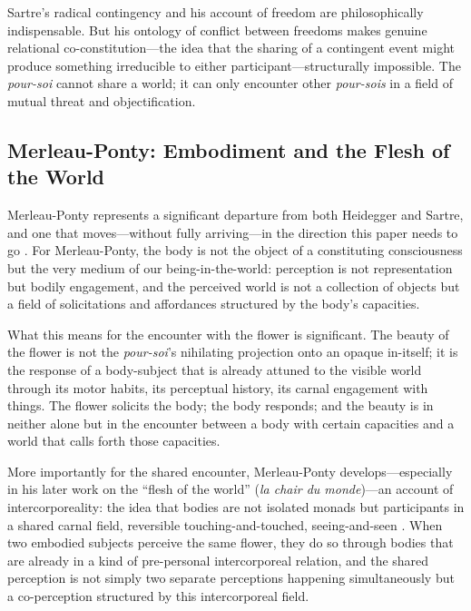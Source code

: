 \begin{claim}
Sartre's radical contingency and his account of freedom are philosophically indispensable. But his ontology of conflict between freedoms makes genuine relational co-constitution---the idea that the sharing of a contingent event might produce something irreducible to either participant---structurally impossible. The \emph{pour-soi} cannot share a world; it can only encounter other \emph{pour-sois} in a field of mutual threat and objectification.
\end{claim}

\subsection{Merleau-Ponty: Embodiment and the Flesh of the World}
\label{p14:subsec:merleau}

\noindent
Merleau-Ponty represents a significant departure from both Heidegger and Sartre, and one that moves---without fully arriving---in the direction this paper needs to go \parencite{merleau-ponty1962}. For Merleau-Ponty, the body is not the object of a constituting consciousness but the very medium of our being-in-the-world: perception is not representation but bodily engagement, and the perceived world is not a collection of objects but a field of solicitations and affordances structured by the body's capacities.

What this means for the encounter with the flower is significant. The beauty of the flower is not the \emph{pour-soi}'s nihilating projection onto an opaque in-itself; it is the response of a body-subject that is already attuned to the visible world through its motor habits, its perceptual history, its carnal engagement with things. The flower solicits the body; the body responds; and the beauty is in neither alone but in the encounter between a body with certain capacities and a world that calls forth those capacities.

More importantly for the shared encounter, Merleau-Ponty develops---especially in his later work on the ``flesh of the world'' (\emph{la chair du monde})---an account of intercorporeality: the idea that bodies are not isolated monads but participants in a shared carnal field, reversible touching-and-touched, seeing-and-seen \parencite{merleau-ponty1962}. When two embodied subjects perceive the same flower, they do so through bodies that are already in a kind of pre-personal intercorporeal relation, and the shared perception is not simply two separate perceptions happening simultaneously but a co-perception structured by this intercorporeal field.


